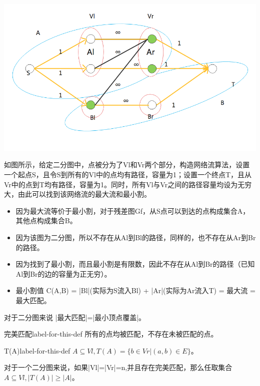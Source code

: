 \centerline{\includegraphics[scale=0.6]{Ln11.image/networkflow3.png}}
\begin{example}
  如图所示，给定二分图中，点被分为了Vl和Vr两个部分，构造网络流算法，设置一个起点S，且令S到所有的Vl中的点均有路径，容量为1；设置一个终点T，且从Vr中的点到T均有路径，容量为1。同时，所有Vl与Vr之间的路径容量均设为无穷大，由此可以找到该网络流的最大流和最小割。
\end{example}
\begin{itemize}
  \item 因为最大流等价于最小割，对于残差图Gf，从S点可以到达的点构成集合A，其他点构成集合B。
  \item 因为该图为二分图，所以不存在从Al到Bl的路径，同样的，也不存在从Ar到Br的路径。
  \item 因为找到了最小割，而且最小割是有限数，因此不存在从Al到Br的路径（已知Al到Br的边的容量为正无穷）。
  \item 最小割值 C(A,B) = |Bl|(实际为S流入Bl) + |Ar|(实际为Ar流入T) = 最大流 = 最大匹配。
\end{itemize}
对于二分图来说 |最大匹配|=|最小顶点覆盖|。

\begin{definition}{完美匹配}{label-for-this-def}
    所有的点均被匹配，不存在未被匹配的点。
\end{definition}

\begin{definition}{T(A)}{label-for-this-def}
    \(A \subseteq Vl,T(A) = \{b \in Vr | (a,b) \in E \}\)。
\end{definition}

对于一个二分图来说，如果|Vl|=|Vr|=n,并且存在完美匹配，那么任取集合\(A \subseteq Vl,|T(A)| \ge |A|\)。

